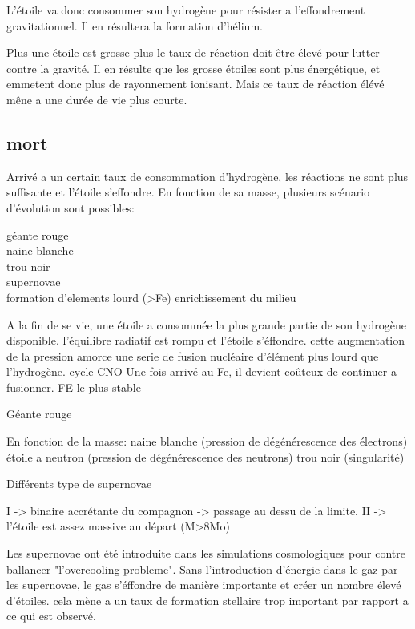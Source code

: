 L'étoile va donc consommer son hydrogène pour résister a l’effondrement gravitationnel.
Il en résultera la formation d'hélium.

Plus une étoile est grosse plus le taux de réaction doit être élevé pour lutter contre la gravité.
Il en résulte que les grosse étoiles sont plus énergétique, et emmetent donc plus de rayonnement ionisant.
Mais ce taux de réaction élévé mêne a une durée de vie plus courte.


\subsection{mort}

Arrivé a un certain taux de consommation d'hydrogène, 
les réactions ne sont plus suffisante et l'étoile s’effondre.
En fonction de sa masse, plusieurs scénario d’évolution sont possibles:



géante rouge\\
naine blanche\\
trou noir\\
supernovae\\
formation d'elements lourd (>Fe)
enrichissement du milieu







A la fin de se vie, une étoile a consommée la plus grande partie de son hydrogène disponible.
l'équilibre radiatif est rompu et l'étoile s'éffondre.
cette augmentation de la pression amorce une serie de fusion nucléaire d’élément plus lourd que l’hydrogène.
cycle CNO
Une fois arrivé au Fe, il devient coûteux de continuer a fusionner.
FE le plus stable



Géante rouge

En fonction de la masse:
naine blanche (pression de dégénérescence des électrons)
étoile a neutron (pression de dégénérescence des neutrons)
trou noir (singularité)



Différents type de supernovae

I -> binaire accrétante du compagnon -> passage au dessu de la limite.
II -> l'étoile est assez massive au départ (M>8Mo)


Les supernovae ont été introduite dans les simulations cosmologiques pour contre ballancer "l'overcooling probleme".
Sans l'introduction d'énergie dans le gaz par les supernovae, le gas s'éffondre de manière importante et créer un nombre élevé d'étoiles.
cela mène a un taux de formation stellaire trop important par rapport a ce qui est observé.



